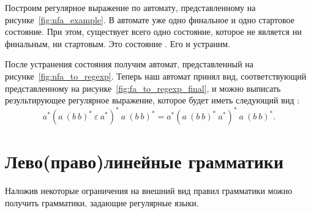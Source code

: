 \begin{example}
    Построим регулярное выражение по автомату, представленному на рисунке~\ref{fig:nfa_example}.
    В автомате уже одно финальное и одно стартовое состояние.
    При этом, существует всего одно состояние, которое не является ни финальным, ни стартовым.
    Это состояние .
    Его и устраним.

    После устранения состояния  получим автомат, представленный на рисунке~\ref{fig:nfa_to_regexp}.
    Теперь наш автомат принял вид, соответствующий представленному на рисунке~\ref{fig:fa_to_regexp_final}, и можно выписать результирующее регулярное выражение, которое будет иметь следующий вид%
    :
    \[
    a^*(a \ (b \ b)^* \ \varepsilon \ a^*)^* \ a \ (b \ b)^* =
    a^*(a \ (b \ b)^* \ a^*)^* \ a \ (b \ b)^*.
    \]

    \begin{marginfigure}
        \begin{center}
        \end{center}
        \caption{Пример построения регулярного выражения по конечному автомату: финальное состояние автомата}
        \label{fig:nfa_to_regexp}
    \end{marginfigure}

\end{example}


\section{Лево(право)линейные грамматики}

Наложив некоторые ограничения на внешний вид правил грамматики можно получить грамматики, задающие регулярные языки.

